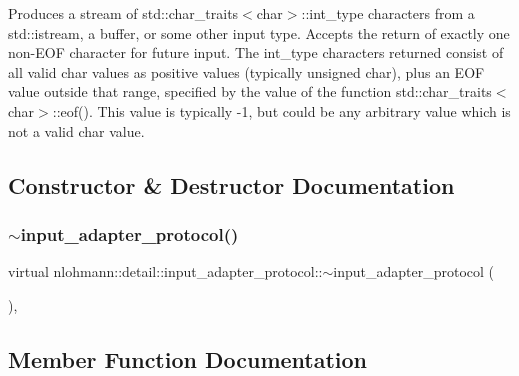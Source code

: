 Produces a stream of std\+::char\+\_\+traits$<$char$>$\+::int\+\_\+type characters from a std\+::istream, a buffer, or some other input type. Accepts the return of exactly one non-\/\+E\+OF character for future input. The int\+\_\+type characters returned consist of all valid char values as positive values (typically unsigned char), plus an E\+OF value outside that range, specified by the value of the function std\+::char\+\_\+traits$<$char$>$\+::eof(). This value is typically -\/1, but could be any arbitrary value which is not a valid char value. 

\subsection{Constructor \& Destructor Documentation}
\mbox{\label{structnlohmann_1_1detail_1_1input__adapter__protocol_a92dac74def4ac5adacd0684088bd4082}} 
\subsubsection{\texorpdfstring{$\sim$input\_adapter\_protocol()}{~input\_adapter\_protocol()}}
{\footnotesize\ttfamily virtual nlohmann\+::detail\+::input\+\_\+adapter\+\_\+protocol\+::$\sim$input\+\_\+adapter\+\_\+protocol (\begin{DoxyParamCaption}{ }\end{DoxyParamCaption})\hspace{0.3cm}{\ttfamily [virtual]}, {\ttfamily [default]}}



\subsection{Member Function Documentation}
\mbox{\label{structnlohmann_1_1detail_1_1input__adapter__protocol_aac10a6a4048a8ce8e2ed50277692a3ca}} 
